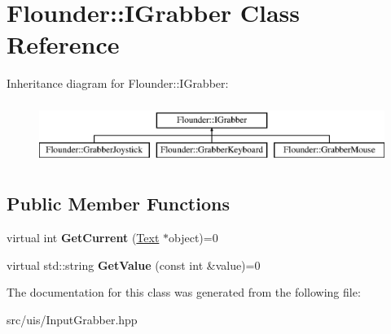 \hypertarget{class_flounder_1_1_i_grabber}{}\section{Flounder\+:\+:I\+Grabber Class Reference}
\label{class_flounder_1_1_i_grabber}
Inheritance diagram for Flounder\+:\+:I\+Grabber\+:\begin{figure}[H]
\begin{center}
\leavevmode
\includegraphics[height=2.000000cm]{class_flounder_1_1_i_grabber}
\end{center}
\end{figure}
\subsection*{Public Member Functions}
\begin{DoxyCompactItemize}
\item 
\mbox{\label{class_flounder_1_1_i_grabber_a9f8ec788491d367a5764f337bc73bbdd}} 
virtual int {\bfseries Get\+Current} (\hyperlink{class_flounder_1_1_text}{Text} $\ast$object)=0
\item 
\mbox{\label{class_flounder_1_1_i_grabber_a534d7e06c871d7ce433bdb42b16bcaad}} 
virtual std\+::string {\bfseries Get\+Value} (const int \&value)=0
\end{DoxyCompactItemize}


The documentation for this class was generated from the following file\+:\begin{DoxyCompactItemize}
\item 
src/uis/Input\+Grabber.\+hpp\end{DoxyCompactItemize}
